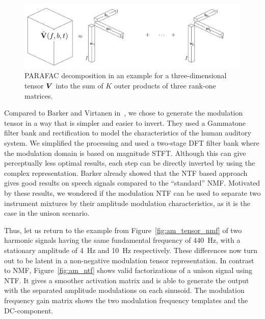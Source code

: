 \begin{figure}[!t]
  \centering
  \includegraphics[width=1\textwidth]{Chapters/06_Separation_Unknown/figures/cpd.pdf}
  \caption{PARAFAC decomposition in an example for a three-dimensional tensor \({\bm{V}}\) into the sum of \(K\) outer products of three rank-one matrices.}
  \label{fig:cpd}
\end{figure}

\par
Compared to Barker and Virtanen in~\cite{barker13}, we chose to generate the modulation tensor in a way that is simpler and easier to invert. 
They used a Gammatone filter bank and rectification to model the characteristics of the human auditory system. 
We simplified the processing and used a two-stage DFT filter bank where the modulation domain is based on magnitude \acs{STFT}. 
Although this can give perceptually less optimal results, each step can be directly inverted by using the complex representation.
Barker already showed that the \acs{NTF} based approach gives good results on speech signals compared to the ``standard'' \acs{NMF}. 
Motivated by these results, we wondered if the modulation \acs{NTF} can be used to separate two instrument mixtures by their amplitude modulation characteristics, as it is the case in the unison scenario.
\par
Thus, let us return to the example from Figure~\ref{fig:am_tensor_nmf} of two harmonic signals having the same fundamental frequency of 440~\si{\hertz}, with a stationary amplitude of 4~\si{\hertz} and 10~\si{\hertz} respectively. 
These differences now turn out to be latent in a non-negative modulation tensor representation.
In contrast to \acs{NMF}, Figure~\ref{fig:am_ntf} shows valid factorizations of a unison signal using \acs{NTF}.
It gives a smoother activation matrix and is able to generate the output with the separated amplitude modulations on each sinusoid. 
The modulation frequency gain matrix shows the two modulation frequency templates and the DC-component.


